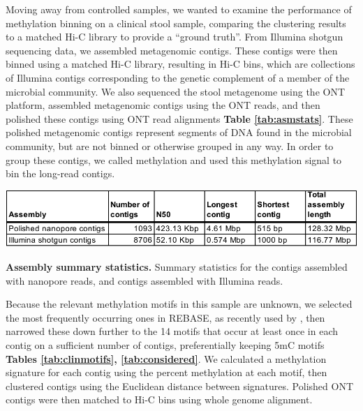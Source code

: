 Moving away from controlled samples, we wanted to examine the performance of methylation binning on a clinical stool sample, comparing the clustering results to a matched Hi-C library to provide a “ground truth”. From Illumina shotgun sequencing data, we assembled metagenomic contigs. These contigs were then binned using a matched Hi-C library, resulting in Hi-C bins, which are collections of Illumina contigs corresponding to the genetic complement of a member of the microbial community. We also sequenced the stool metagenome using the ONT platform, assembled metagenomic contigs using the ONT reads, and then polished these contigs using ONT read alignments {\bf Table \ref{tab:asmstats}}. These polished metagenomic contigs represent segments of DNA found in the microbial community, but are not binned or otherwise grouped in any way. In order to group these contigs, we called methylation and used this methylation signal to bin the long-read contigs.


\begin{table}[!hb]
\centering
\includegraphics[width = 1\linewidth,keepaspectratio]{figure/asmstats.pdf}
\caption[Assembly summary statistics]{{\bf Assembly summary statistics.} Summary statistics for the contigs assembled with nanopore reads, and contigs assembled with Illumina reads. }
\label{tab:asmstats}
\end{table}


Because the relevant methylation motifs in this sample are unknown, we selected the most frequently occurring ones in REBASE, as recently used by \citep{Tourancheau2021-hv}, then narrowed these down further to the 14 motifs that occur at least once in each contig on a sufficient number of contigs, preferentially keeping 5mC motifs {\bf Tables \ref{tab:clinmotifs}, \ref{tab:considered}}. We calculated a methylation signature for each contig using the percent methylation at each motif, then clustered contigs using the Euclidean distance between signatures. Polished ONT contigs were then matched to Hi-C bins using whole genome alignment.

